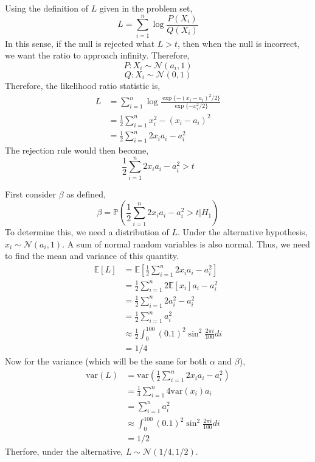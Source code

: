 \documentclass[12pt,twoside]{article}
\begin{document}
\begin{problems}
\newpage

\problem  %

\begin{problemparts}

\problempart  %

Using the definition of $L$ given in the problem set,
$$ L = \sum_{i = 1}^n \log \frac{P(X_i)}{Q(X_i)} $$
In this sense, if the null is rejected what $L > t$, then when the null is
incorrect, we want the ratio to approach infinity. Therefore,
$$ P : X_i \sim \mathcal{N}(a_i, 1) $$
$$ Q : X_i \sim \mathcal{N}(0, 1) $$
Therefore, the likelihood ratio statistic is,
\begin{align*}
    L &= \sum_{i = 1}^n \log \frac{\exp\{-(x_i -
    a_i)^2/2\}}{\exp\{-x_i^2/2\}} \\
    &= \frac{1}{2}\sum_{i = 1}^n x_i^2 - (x_i - a_i)^2 \\
    &= \frac{1}{2}\sum_{i = 1}^n 2 x_i a_i - a_i^2
\end{align*}
The rejection rule would then become,
$$ \boxed{\frac{1}{2}\sum_{i = 1}^n 2 x_i a_i - a_i^2 > t} $$

\problempart  %

First consider $\beta$ as defined,
$$ \beta = \mathbb{P}\left(\frac{1}{2}\sum_{i = 1}^n 2 x_i a_i - a_i^2 > t |
H_1 \right) $$
To determine this, we need a distribution of $L$. Under the alternative
hypothesis, $x_i \sim \mathcal{N}(a_i, 1)$. A sum of normal random variables
is also normal. Thus, we need to find the mean and variance of this quantity.
\begin{align*}
    \mathbb{E}[L] &= \mathbb{E}\left[\frac{1}{2}\sum_{i = 1}^n 2 x_i a_i -
    a_i^2\right] \\
    &= \frac{1}{2}\sum_{i = 1}^n 2 \mathbb{E}[x_i] a_i - a_i^2 \\
    &= \frac{1}{2}\sum_{i = 1}^n 2 a_i^2 - a_i^2 \\
    &= \frac{1}{2}\sum_{i = 1}^n a_i^2 \\
    &\approx \frac{1}{2}\int_{0}^{100} (0.1)^2 \sin^2 \frac{2 \pi i}{100} di \\
    &= 1/4
\end{align*}
Now for the variance (which will be the same for both $\alpha$ and $\beta$),
\begin{align*}
    \mathrm{var}(L) &= \mathrm{var}\left(\frac{1}{2}\sum_{i = 1}^n 2 x_i a_i -
    a_i^2\right) \\
    &= \frac{1}{4} \sum_{i = 1}^n 4 \mathrm{var}(x_i) a_i \\
    &= \sum_{i = 1}^n a_i^2 \\
    &\approx \int_{0}^{100} (0.1)^2 \sin^2 \frac{2 \pi i}{100} di \\
    &= 1/2
\end{align*}
Therfore, under the alternative, $L \sim \mathcal{N}(1/4, 1/2)$.


\end{problemparts}
\end{problems}
\end{document}
